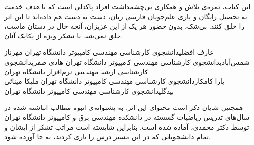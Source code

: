 \newpage
\thispagestyle{empty}

\scriptsize{
\p
این کتاب، ثمره‌ی تلاش و همکاری بی‌چشمداشت افراد پاکدلی است
که با هدف خدمت به تحصیل رایگان و یاری علم‌جویان فارسی زبان،
دست به دست هم داده‌اند تا این اثر را خلق کنند.
بی‌شک، بدون حضور هر یک از این عزیزان، آنچه حال در دستان ماست،
خلق نمی‌شد. با تشکر ویژه از یکایک آنان:
}

\scriptsize{
    \begin{AFFILIATIONS}
        \AFFILIATIONROW
        {عارف افضلی}{دانشجوی کارشناسی مهندسی کامپیوتر دانشگاه تهران}{}
        {مهرناز شمس‌آبادی}{دانشجوی کارشناسی مهندسی کامپیوتر دانشگاه تهران}{}
        {هادی صفری}{دانشجوی کارشناسی ارشد مهندسی نرم‌افزار دانشگاه تهران}{}
        \\\AFFILIATIONROW
        {یارا کامکار}{دانشجوی کارشناسی مهندسی کامپیوتر دانشگاه تهران}{}
        {ملیکا مینائی بیدگلی}{دانشجوی کارشناسی مهندسی کامپیوتر دانشگاه تهران}{}
        {}{}{}
    \end{AFFILIATIONS}
}

\scriptsize{
\p
همچنین شایان ذکر است محتوای این اثر،
به پشتوانه‌ی انبوه مطالب انباشته شده در سال‌های تدریس ریاضیات گسسته
در دانشکده مهندسی برق و کامپیوتر دانشگاه تهران
توسط دکتر محمدی، آماده شده است.
بنابراین شایسته است مراتب تشکر از ایشان و تمام دانشجویانی که در این مسیر
درس را یاری کردند، به جا آورده شود.
}